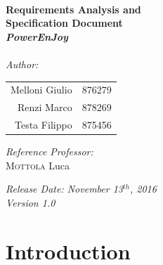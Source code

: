 \documentclass[11pt,a4paper]{report}
\begin{document}
\begin{titlepage}
\HRule \\[0.4cm]
{ \huge \bfseries Requirements Analysis and\\Specification Document\\[0.5cm]\textit{PowerEnJoy}}\\[0.4cm] %
\HRule \\[1.5cm]
 
\Large \emph{Author:}\\
\LARGE{
\begin{center}
\begin{tabular}{ r  l }
	Melloni Giulio & 876279\\
	Renzi Marco & 878269\\
	Testa Filippo & 875456 \\
\end{tabular}
\end{center}
}
\vspace*{0.8cm}
\Large{\emph{Reference Professor:} \\
{\textsc{Mottola} Luca} 
}

 \vspace*{1cm}
{\LARGE {\it Release Date: November 13$^{th}$, 2016\\Version 1.0}}

\end{titlepage}


\tableofcontents

\chapter{Introduction}
\end{document}
